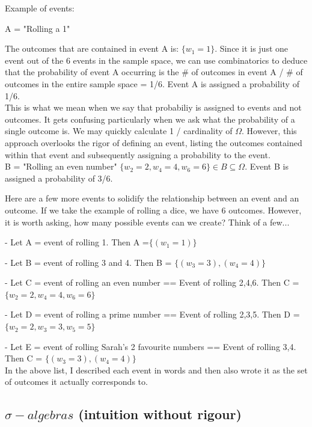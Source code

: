 \documentclass[11pt]{article}
\begin{document}
Example of events:

A = "Rolling a 1"

The outcomes that are contained in event A is: $\{w_1 = 1\}$. Since it is just one event out of the 6 events in the sample space, we can use combinatorics to deduce that the probability of event A occurring is the \# of outcomes in event A / \# of outcomes in the entire sample space = 1/6. Event A is assigned a probability of 1/6. \\

This is what we mean when we say that probabiliy is assigned to events and not outcomes. It gets confusing particularly when we ask what the probability of a single outcome is. We may quickly calculate 1 / cardinality of $\Omega$. However, this approach overlooks the rigor of defining an event, listing the outcomes contained within that event and subsequently assigning a probability to the event. \\

B = "Rolling an even number"
$ \{ w_2 = 2, w_4 = 4, w_6 = 6 \} \in B \subseteq \Omega $. Event B is assigned a probability of 3/6.

Here are a few more events to solidify the relationship between an event and an outcome. If we take the example of rolling a dice, we have 6 outcomes. However, it is worth asking, how many possible events can we create? Think of a few...

- Let A = event of rolling 1. Then A =$ \{ (w_1 = 1) \}$

- Let B = event of rolling 3 and 4. Then B = $ \{ (w_3 = 3), (w_4 = 4) \}$

- Let C = event of rolling an even number == Event of rolling 2,4,6. Then C = $ \{w_2 = 2, w_4 = 4, w_6 = 6 \}$

- Let D = event of rolling a prime number == Event of rolling 2,3,5. Then D = $ \{w_2= 2, w_3 = 3, w_5 = 5 \}$

- Let E = event of rolling Sarah's 2 favourite numbers == Event of rolling 3,4. Then C =  $ \{ (w_3 = 3), (w_4 = 4) \}$ \\

In the above list, I described each event in words and then also wrote it as the set of outcomes it actually corresponds to.

\subsection{$\sigma-algebras$ (intuition without rigour)}
\end{document}
